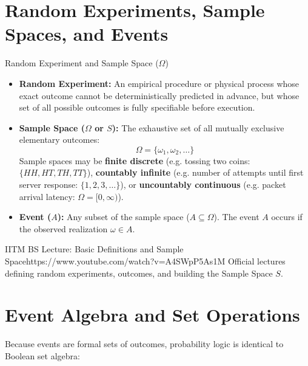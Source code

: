 \section{Random Experiments, Sample Spaces, and Events}

\begin{definitionbox}{Random Experiment and Sample Space ($\Omega$)}
\begin{itemize}
    \item \textbf{Random Experiment:} An empirical procedure or physical process whose exact outcome cannot be deterministically predicted in advance, but whose set of all possible outcomes is fully specifiable before execution.
    \item \textbf{Sample Space ($\Omega$ or $S$):} The exhaustive set of all mutually exclusive elementary outcomes:
    $$\Omega = \{\omega_1, \omega_2, \dots\}$$
    Sample spaces may be \textbf{finite discrete} (e.g. tossing two coins: $\{HH, HT, TH, TT\}$), \textbf{countably infinite} (e.g. number of attempts until first server response: $\{1, 2, 3, \dots\}$), or \textbf{uncountably continuous} (e.g. packet arrival latency: $\Omega = [0, \infty)$).
    \item \textbf{Event ($A$):} Any subset of the sample space ($A \subseteq \Omega$). The event $A$ occurs if the observed realization $\omega \in A$.
\end{itemize}
\end{definitionbox}

\begin{videocard}{IITM BS Lecture: Basic Definitions and Sample Space}{https://www.youtube.com/watch?v=A4SWpP5As1M}
Official lectures defining random experiments, outcomes, and building the Sample Space $S$.
\end{videocard}

\section{Event Algebra and Set Operations}

Because events are formal sets of outcomes, probability logic is identical to Boolean set algebra:

